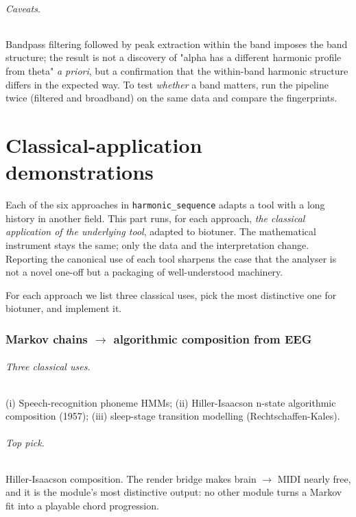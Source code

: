 \documentclass[11pt,a4paper]{article}
\begin{document}
\paragraph{Caveats.}  Bandpass filtering followed by peak extraction
within the band imposes the band structure; the result is not a
discovery of "alpha has a different harmonic profile from theta"
\emph{a priori}, but a confirmation that the within-band harmonic
structure differs in the expected way. To test \emph{whether} a band
matters, run the pipeline twice (filtered and broadband) on the same
data and compare the fingerprints.

\part{Classical-application demonstrations}

Each of the six approaches in \texttt{harmonic\_sequence} adapts a tool
with a long history in another field. This part runs, for each
approach, \emph{the classical application of the underlying tool},
adapted to biotuner. The mathematical instrument stays the same; only
the data and the interpretation change. Reporting the canonical use of
each tool sharpens the case that the analyser is not a novel one-off
but a packaging of well-understood machinery.

For each approach we list three classical uses, pick the most distinctive
one for biotuner, and implement it.

\section{Markov chains $\to$ algorithmic composition from EEG}

\paragraph{Three classical uses.}  (i) Speech-recognition phoneme HMMs;
(ii) Hiller-Isaacson n-state algorithmic composition (1957);
(iii) sleep-stage transition modelling (Rechtschaffen-Kales).

\paragraph{Top pick.}  Hiller-Isaacson composition. The render bridge
makes brain $\to$ MIDI nearly free, and it is the module's most
distinctive output: no other module turns a Markov fit into a playable
chord progression.
\end{document}
